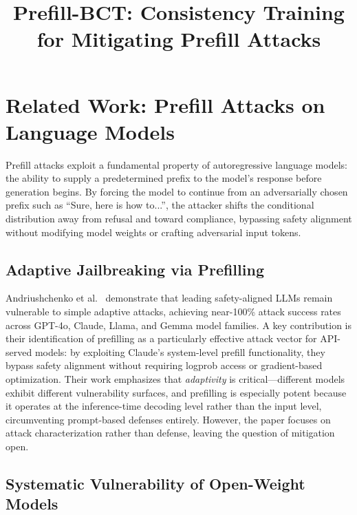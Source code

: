 \documentclass{article}
\title{Prefill-BCT: Consistency Training for Mitigating Prefill Attacks}
\author{}
\date{}
\begin{document}
\maketitle

\section{Related Work: Prefill Attacks on Language Models}

Prefill attacks exploit a fundamental property of autoregressive language models: the ability to supply a predetermined prefix to the model's response before generation begins. By forcing the model to continue from an adversarially chosen prefix such as ``Sure, here is how to...'', the attacker shifts the conditional distribution away from refusal and toward compliance, bypassing safety alignment without modifying model weights or crafting adversarial input tokens.

\subsection{Adaptive Jailbreaking via Prefilling}

Andriushchenko et al.~\cite{andriushchenko2024jailbreaking} demonstrate that leading safety-aligned LLMs remain vulnerable to simple adaptive attacks, achieving near-100\% attack success rates across GPT-4o, Claude, Llama, and Gemma model families. A key contribution is their identification of prefilling as a particularly effective attack vector for API-served models: by exploiting Claude's system-level prefill functionality, they bypass safety alignment without requiring logprob access or gradient-based optimization. Their work emphasizes that \emph{adaptivity} is critical---different models exhibit different vulnerability surfaces, and prefilling is especially potent because it operates at the inference-time decoding level rather than the input level, circumventing prompt-based defenses entirely. However, the paper focuses on attack characterization rather than defense, leaving the question of mitigation open.

\subsection{Systematic Vulnerability of Open-Weight Models}
\end{document}
